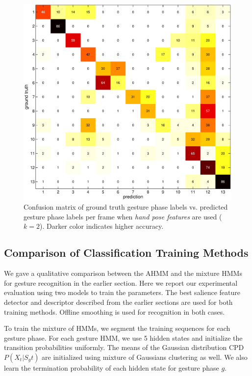 \documentclass{sigchi}
\begin{document}
\begin{figure}
\centering
\hspace{-8.5755mm}\includegraphics[width=1.05\columnwidth]{figure/cm11.eps}
\caption{Confusion matrix of ground truth gesture phase labels vs. predicted
gesture phase labels per frame when \textit{hand pose features} are used
($k=2$). Darker
color indicates higher accuracy.}
\label{fig:cm11}
\end{figure}

\subsection{Comparison of Classification Training Methods}
We gave a qualitative comparison between the AHMM and the mixture HMMs for
gesture recognition in the earlier section. Here we report our experimental
evaluation using two models to train the parameters. The best salience feature detector and descriptor
described from the earlier sections are used for both training methods. Offline
smoothing is used for recognition in both cases. 

To train the mixture of HMMs, we segment the training sequences for each gesture
phase. For each gesture HMM, we use 5 hidden states and initialize the
transition probabilities uniformly. The means of the Gaussian distribution CPD
$P(X_t|S_gt)$ are initialized using mixture of Gaussians clustering as well. We
also learn the termination probability of each hidden state for gesture phase
$g$.
\end{document}
